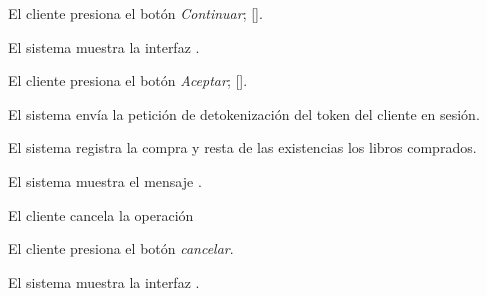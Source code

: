 {\begin{trayectoriaPrincipal}
    \item El cliente presiona el botón \textit{Continuar};
      [].

    \item El sistema muestra la interfaz
      .

    \item El cliente presiona el botón \textit{Aceptar};
      [].


    \item El sistema envía la petición de detokenización del token del
      cliente en sesión\footnotemark.

    \item El sistema registra la compra y resta de las existencias los libros
      comprados.

    \item El sistema muestra el mensaje
      .

  \end{trayectoriaPrincipal}




  \begin{trayectoriaAlternativa}
    {El cliente cancela la operación}

    \item El cliente presiona el botón \textit{cancelar}.

    \item El sistema muestra la interfaz
      .

  \end{trayectoriaAlternativa}

}
